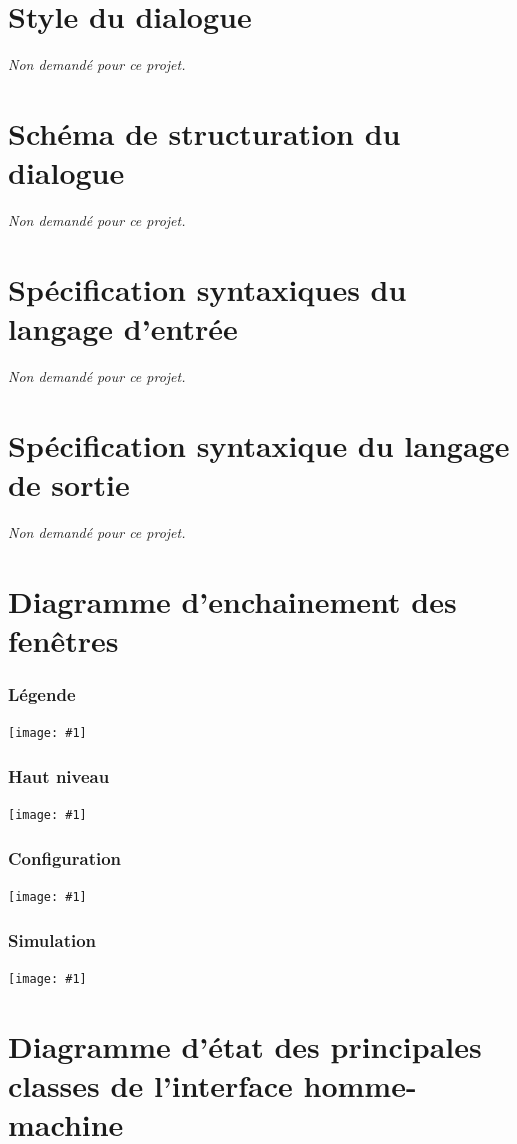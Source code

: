 \newcommand{\nondemande}{\emph{Non demandé pour ce projet.}}
\part{Style du dialogue}
\nondemande
\part{Schéma de structuration du dialogue}
\nondemande
\part{Spécification syntaxiques du langage d'entrée}
\nondemande
\part{Spécification syntaxique du langage de sortie}
\nondemande
\part{Diagramme d'enchainement des fenêtres}
\newcommand{\image}[1]{%
\begin{center}
\texttt{[image: \#1]}
\end{center}}

\section{Légende}
\image{../../DEF/src/img/Legende.pdf}
\section{Haut niveau}
\image{../../DEF/src/img/DEF-full.pdf}
\section{Configuration}
\image{../../DEF/src/img/Configuration-full.pdf}
\section{Simulation}
\image{../../DEF/src/img/Simulation-full.pdf}
\part{Diagramme d'état des principales classes de l'interface homme-machine}
